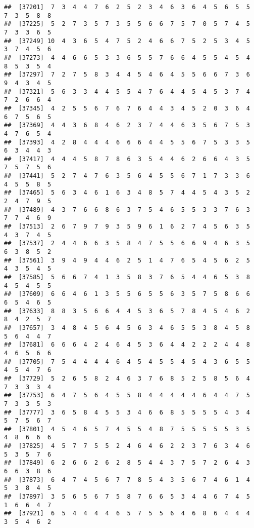 \documentclass[
]{book}
\begin{document}
\begin{verbatim}
##  [37201]  7  3  4  4  7  6  2  5  2  3  4  6  3  6  4  5  6  5  5  7  3  5  8  8
##  [37225]  5  2  7  3  5  7  3  5  5  6  6  7  5  7  0  5  7  4  5  7  3  3  6  5
##  [37249] 10  4  3  6  5  4  7  5  2  4  6  6  7  5  2  5  3  4  5  3  7  4  5  6
##  [37273]  4  4  6  6  5  3  3  6  5  5  7  6  6  4  5  5  4  5  4  8  5  3  5  4
##  [37297]  7  2  7  5  8  3  4  4  5  4  6  4  5  5  6  6  7  3  6  9  4  3  4  5
##  [37321]  5  6  3  3  4  4  5  5  4  7  6  4  4  5  4  5  3  7  4  7  2  6  6  4
##  [37345]  4  2  5  5  6  7  6  7  6  4  4  3  4  5  2  0  3  6  4  6  7  5  6  5
##  [37369]  4  4  3  6  8  4  6  2  3  7  4  4  6  3  5  6  7  5  3  4  7  6  5  4
##  [37393]  4  2  8  4  4  4  6  6  6  4  4  5  5  6  7  5  3  3  5  6  3  4  4  3
##  [37417]  4  4  4  5  8  7  8  6  3  5  4  4  6  2  6  6  4  3  5  7  5  7  5  6
##  [37441]  5  2  7  4  7  6  3  5  6  4  5  5  6  7  1  7  3  3  6  4  5  5  8  5
##  [37465]  5  6  3  4  6  1  6  3  4  8  5  7  4  4  5  4  3  5  2  2  4  7  9  5
##  [37489]  4  3  7  6  6  8  6  3  7  5  4  6  5  5  3  3  7  6  3  7  7  4  6  9
##  [37513]  2  6  7  9  7  9  3  5  9  6  1  6  2  7  4  5  6  3  5  4  3  7  4  5
##  [37537]  2  4  4  6  6  3  5  8  4  7  5  5  6  6  9  4  6  3  5  6  3  8  5  2
##  [37561]  3  9  4  9  4  4  6  2  5  1  4  7  6  5  4  5  6  2  5  4  3  5  4  5
##  [37585]  5  6  6  7  4  1  3  5  8  3  7  6  5  4  4  6  5  3  8  4  5  4  5  5
##  [37609]  6  6  4  6  1  3  5  5  6  5  5  6  3  5  7  5  8  6  6  6  5  4  6  5
##  [37633]  8  8  3  5  6  6  4  4  5  3  6  5  7  8  4  5  4  6  2  8  4  2  5  7
##  [37657]  3  4  8  4  5  6  4  5  6  3  4  6  5  5  3  8  4  5  8  5  6  4  4  7
##  [37681]  6  6  6  4  2  4  6  4  5  3  6  4  4  2  2  2  4  4  8  4  6  5  6  6
##  [37705]  7  5  4  4  4  4  6  4  5  4  5  5  4  5  4  3  6  5  5  4  5  4  7  6
##  [37729]  5  2  6  5  8  2  4  6  3  7  6  8  5  2  5  8  5  6  4  7  3  3  3  4
##  [37753]  6  4  7  5  6  4  5  5  8  4  4  4  4  4  6  4  4  7  5  7  3  3  5  3
##  [37777]  3  6  5  8  4  5  5  3  4  6  6  8  5  5  5  5  4  3  4  5  7  5  6  7
##  [37801]  4  5  4  6  5  7  4  5  5  4  8  7  5  5  5  5  5  3  5  4  8  6  6  6
##  [37825]  4  5  7  7  5  5  2  4  6  4  6  2  2  3  7  6  3  4  6  5  3  5  7  6
##  [37849]  6  2  6  6  2  6  2  8  5  4  4  3  7  5  7  2  6  4  3  6  6  3  8  6
##  [37873]  6  4  7  4  5  6  7  7  8  5  4  3  5  6  7  4  6  1  4  5  3  8  4  5
##  [37897]  3  5  6  5  6  7  5  8  7  6  6  5  3  4  4  6  7  4  5  1  6  6  4  7
##  [37921]  6  5  4  4  4  4  6  5  7  5  5  6  4  6  8  6  4  4  4  3  5  4  6  2

\end{verbatim}
\end{document}
